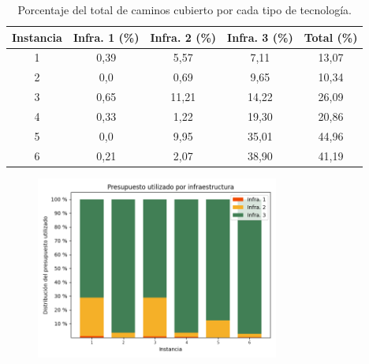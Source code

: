 \documentclass{article}
\begin{document}
  \begin{table}[h!]
    \centering
    \begin{tabular}{ccccc}
      \toprule
        Instancia & Infra. 1 (\%) & Infra. 2 (\%) & Infra. 3 (\%) & Total (\%) \\
      \midrule
        1 & 0,39 & 5,57 & 7,11 & 13,07 \\
        2 & 0,0  & 0,69 & 9,65 & 10,34 \\
        3 & 0,65 & 11,21 & 14,22 & 26,09 \\
        4 & 0,33 & 1,22 & 19,30 & 20,86 \\
        5 & 0,0  & 9,95 & 35,01 & 44,96 \\
        6 & 0,21 & 2,07 & 38,90 & 41,19 \\
      \bottomrule
    \end{tabular}
    \caption{Porcentaje del total de caminos cubierto por cada tipo de tecnología.}
    \label{table:montevideoinfracoverage}
  \end{table}

  \begin{figure}[h!]
    \centering
    \includegraphics[width=8cm]{../resources/montevideo_budget_usage_by_infra.png}
      \caption{}
    \label{fig:montevideobudgetusage}
  \end{figure}
\end{document}
